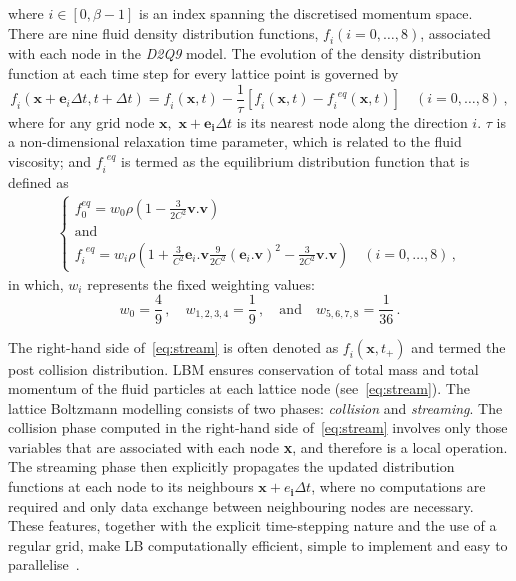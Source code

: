 %
\noindent where $\mathit{i} \in [0, \beta -1]$ is an index spanning the 
discretised momentum space. There are nine fluid density distribution 
functions, $\mathit{f_i}(\mathit{i}=0,\dots,8)$, associated with each node 
in the \textit{D2Q9} model. The evolution of the density distribution function 
at each time step for every lattice point is governed by
%
\begin{equation} 
	\label{eq:stream}
	\mathit{f_i}(\mathbf{x}+\mathbf{e}_{\mathit{i}} \Delta t, t + \Delta t) = 
	\mathit{f_i}(\mathbf{x},t) - \frac{1}{\tau} [\mathit{f_i}(\mathbf{x},t) 
	-\mathit{f_i}^{\mathit{eq}}(\mathbf{x},t)] \quad (\mathit{i}=0,\dots,8) \,,
\end{equation}
%
\noindent where for any grid node $\mathbf{x},$ $\mathbf{x}+\mathbf{e_i} \Delta 
t$ 
is its nearest node along the direction $\mathit{i}$. $\tau$ is a 
non-dimensional relaxation time parameter, which is related to the fluid 
viscosity; and $\mathit{f_i}^{\mathit{eq}}$ is termed as the equilibrium 
distribution function that is defined as
%
\begin{align}
	\begin{cases}
	\mathit{f}_{\mathit{0}}^{\mathit{eq}} = \mathit{w}_{\mathit{0}} \rho (1 - 
	\frac{3}{2\mathit{C}^{\mathit{2}}}\mathbf{v}.\mathbf{v}) \\ 
	\mbox{and}\\
	\mathit{f_i}^{\mathit{eq}} = \mathit{w_i} \rho (1 + 
	\frac{3}{\mathit{C}^{\mathit{2}}}\mathbf{e}_{\mathit{i}}.\mathbf{v} 
	\frac{9}{2\mathit{C}^{\mathit{2}}} 
	(\mathbf{e}_{\mathit{i}}.\mathbf{v})^{\mathit{2}}-\frac{3}{2 
	\mathit{C}^{\mathit{2}}}\mathbf{v}.\mathbf{v}) \quad 
	(\mathit{i}=0,\dots,8)\,,
	\end{cases}
\end{align}
%
\noindent in which, $\mathit{w_i}$ represents the fixed weighting values:
%
\begin{equation}
	\mathit{w}_{\mathit{0}} = \frac{4}{9}\,, \quad 
	\mathit{w}_{\mathit{1,2,3,4}}= 
	\frac{1}{9}\,, \quad \mbox{and} \quad \mathit{w}_{\mathit{5,6,7,8}}= 
	\frac{1}{36}\,.
\end{equation}

The right-hand side of~\cref{eq:stream} is often denoted as 
$\mathit{f_i}(\mathbf{x}, \mathit{t}_{+})$ and termed the post collision 
distribution. LBM ensures conservation of total mass and total momentum of the 
fluid particles at each lattice node (see~\cref{eq:stream}). The lattice 
Boltzmann modelling
consists of two phases: \textit{collision} and \textit{streaming}. The 
collision phase computed in the right-hand side of~\cref{eq:stream} involves 
only those variables that are associated with each node \textbf{x}, and 
therefore is a local operation. The streaming phase then explicitly propagates 
the updated distribution functions at each node to its neighbours 
$\mathbf{x}+\mathbf{\mathit{e}_i} \Delta t$, where no computations are required 
and only data exchange between neighbouring nodes are necessary. These 
features, together with the explicit time-stepping nature and the use of a 
regular grid, make LB computationally efficient, simple to implement and 
easy to parallelise~\citep{Han2007a}. 

